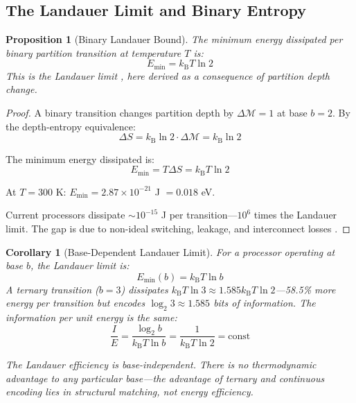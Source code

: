 \documentclass[twocolumn,10pt]{article}
\newtheorem{proposition}[theorem]{Proposition}
\newtheorem{corollary}[theorem]{Corollary}
\theoremstyle{remark}
\newcommand{\kB}{k_{\mathrm{B}}}
\newcommand{\Depth}{\mathcal{M}}
\begin{document}
\subsection{The Landauer Limit and Binary Entropy}

\begin{proposition}[Binary Landauer Bound]
\label{prop:landauer}
The minimum energy dissipated per binary partition transition at temperature $T$ is:
\begin{equation}
    E_{\min} = \kB T \ln 2
\end{equation}
This is the Landauer limit \cite{landauer1961}, here derived as a consequence of partition depth change.
\end{proposition}

\begin{proof}
A binary transition changes partition depth by $\Delta\Depth = 1$ at base $b = 2$. By the depth-entropy equivalence:
\begin{equation}
    \Delta S = \kB \ln 2 \cdot \Delta\Depth = \kB \ln 2
\end{equation}

The minimum energy dissipated is:
\begin{equation}
    E_{\min} = T \Delta S = \kB T \ln 2
\end{equation}

At $T = 300$ K: $E_{\min} = 2.87 \times 10^{-21}$ J $= 0.018$ eV.

Current processors dissipate $\sim 10^{-15}$ J per transition---$10^6$ times the Landauer limit. The gap is due to non-ideal switching, leakage, and interconnect losses \cite{frank2005}.
\end{proof}

\begin{corollary}[Base-Dependent Landauer Limit]
\label{cor:base_landauer}
For a processor operating at base $b$, the Landauer limit is:
\begin{equation}
    E_{\min}(b) = \kB T \ln b
\end{equation}
A ternary transition ($b = 3$) dissipates $\kB T \ln 3 \approx 1.585 \kB T \ln 2$---58.5\% more energy per transition but encodes $\log_2 3 \approx 1.585$ bits of information. The information per unit energy is the same:
\begin{equation}
    \frac{I}{E} = \frac{\log_2 b}{\kB T \ln b} = \frac{1}{\kB T \ln 2} = \text{const}
\end{equation}

The Landauer efficiency is base-independent. There is no thermodynamic advantage to any particular base---the advantage of ternary and continuous encoding lies in \emph{structural matching}, not energy efficiency.
\end{corollary}
\end{document}
